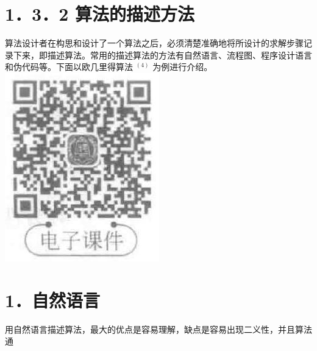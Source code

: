 \documentclass[10pt]{article}
\begin{document}
\section*{1．3．2 算法的描述方法}
算法设计者在构思和设计了一个算法之后，必须清楚准确地将所设计的求解步骤记录下来，即描述算法。常用的描述算法的方法有自然语言、流程图、程序设计语言和伪代码等。下面以欧几里得算法 ${ }^{(4)}$ 为例进行介绍。\\
\includegraphics[max width=\textwidth, center]{2025_06_06_704745ea57b15b2333e5g-027}

\section*{1．自然语言}
用自然语言描述算法，最大的优点是容易理解，缺点是容易出现二义性，并且算法通
\end{document}
